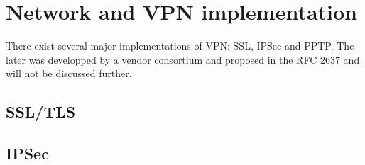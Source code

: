 \section{Network and VPN implementation}



There exist several major implementations of VPN: SSL, IPSec and PPTP.
The later was developped by a vendor consortium and proposed in the RFC 2637 and will not be discussed further.

\subsection{SSL/TLS}

\subsection{IPSec}
